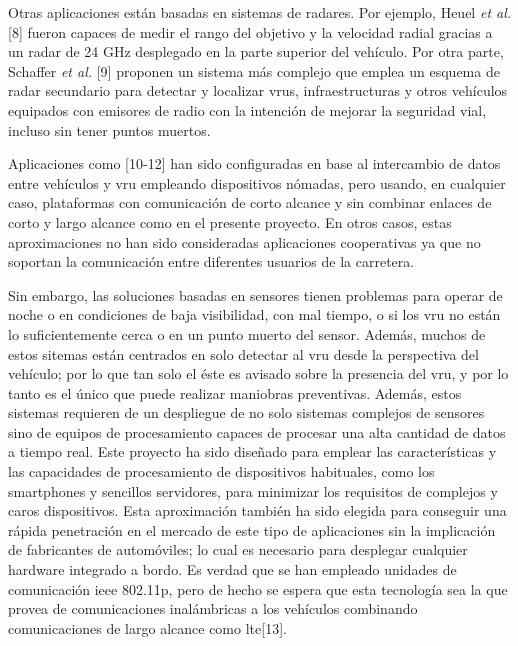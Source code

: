 Otras aplicaciones están basadas en sistemas de radares. Por ejemplo, Heuel \emph{et al.} [8] fueron capaces de medir el rango del objetivo y la velocidad radial gracias a un radar de 24 GHz desplegado en la parte superior del vehículo. Por otra parte, Schaffer \emph{et al.} [9] proponen un sistema más complejo que emplea un esquema de radar secundario para detectar y localizar \gls{vru}s, infraestructuras y otros vehículos equipados con emisores de radio con la intención de mejorar la seguridad vial, incluso sin tener puntos muertos.

Aplicaciones como [10-12] han sido configuradas en base al intercambio de datos entre vehículos y \gls{vru} empleando dispositivos nómadas, pero usando, en cualquier caso, plataformas con comunicación de corto alcance y sin combinar enlaces de corto y largo alcance como en el presente proyecto. En otros casos, estas aproximaciones no han sido consideradas aplicaciones cooperativas ya que no soportan la comunicación entre diferentes usuarios de la carretera.

Sin embargo, las soluciones basadas en sensores tienen problemas para operar de noche o en condiciones de baja visibilidad, con mal tiempo, o si los \gls{vru} no están lo suficientemente cerca o en un punto muerto del sensor. Además, muchos de estos sitemas están centrados en solo detectar al \gls{vru} desde la perspectiva del vehículo; por lo que tan solo el éste es avisado sobre la presencia del
\gls{vru}, y por lo tanto es el único que puede realizar maniobras preventivas. Además, estos sistemas requieren de un despliegue de no solo sistemas complejos de sensores sino de equipos de procesamiento capaces de procesar una alta cantidad de datos a tiempo real. Este proyecto ha sido diseñado para emplear las características y las capacidades de procesamiento de dispositivos habituales, como los smartphones y sencillos servidores, para minimizar los requisitos de complejos y caros dispositivos. Esta aproximación también ha sido elegida para conseguir una rápida penetración en el mercado de este tipo de aplicaciones sin la implicación de fabricantes de automóviles; lo cual es necesario para desplegar cualquier hardware integrado a bordo. Es verdad que se han empleado unidades de comunicación \gls{ieee} 802.11p, pero de hecho se espera que esta tecnología sea la que provea de comunicaciones inalámbricas a los vehículos combinando comunicaciones de largo alcance como \gls{lte}[13].